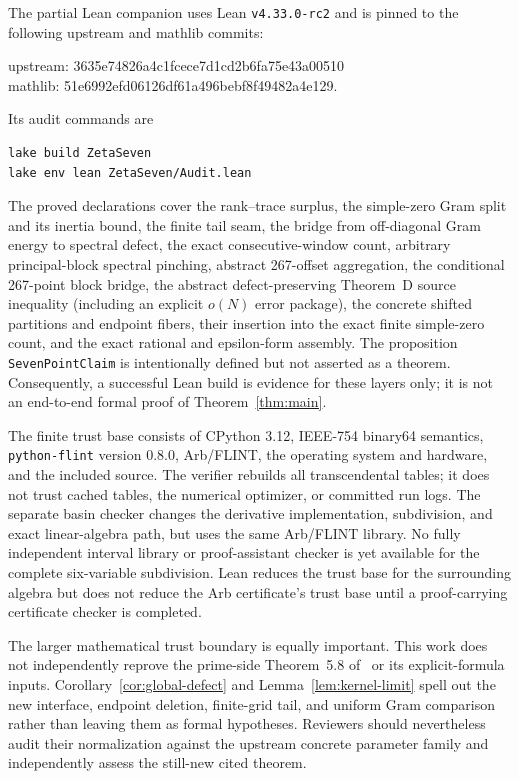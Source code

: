 \documentclass[11pt]{article}
\begin{document}
The partial Lean companion uses Lean \texttt{v4.33.0-rc2} and is pinned to
the following upstream and mathlib commits:
\begin{center}
\small\ttfamily
upstream: 3635e74826a4c1fcece7d1cd2b6fa75e43a00510\\[2pt]
mathlib: 51e6992efd06126df61a496bebf8f49482a4e129.
\end{center}
Its audit commands are
\begin{verbatim}
lake build ZetaSeven
lake env lean ZetaSeven/Audit.lean
\end{verbatim}
The proved declarations cover the rank--trace surplus, the simple-zero Gram
split and its inertia bound, the finite tail seam, the bridge from
off-diagonal Gram energy to spectral defect, the exact consecutive-window
count, arbitrary principal-block spectral pinching, abstract 267-offset
aggregation, the conditional 267-point block bridge, the abstract
defect-preserving Theorem~D source inequality (including an explicit
$o(N)$ error package), the concrete shifted partitions and endpoint fibers,
their insertion into the exact finite simple-zero count, and the exact
rational and epsilon-form assembly.
The proposition \texttt{SevenPointClaim} is intentionally defined but not
asserted as a theorem.  Consequently, a successful Lean build is evidence
for these layers only; it is not an end-to-end formal proof of
Theorem~\ref{thm:main}.

The finite trust base consists of CPython 3.12, IEEE-754 binary64 semantics,
\texttt{python-flint} version 0.8.0, Arb/FLINT, the operating system and hardware,
and the included source.  The verifier rebuilds all transcendental tables; it
does not trust cached tables, the numerical optimizer, or committed run logs.
The separate basin checker changes the derivative implementation,
subdivision, and exact linear-algebra path, but uses the same Arb/FLINT
library.  No fully independent interval library or proof-assistant checker is
yet available for the complete six-variable subdivision.  Lean reduces the
trust base for the surrounding algebra but does not reduce the Arb
certificate's trust base until a proof-carrying certificate checker is
completed.

The larger mathematical trust boundary is equally important.  This work
does not independently reprove the prime-side Theorem~5.8 of~\cite{Claude26}
or its explicit-formula inputs.  Corollary~\ref{cor:global-defect} and
Lemma~\ref{lem:kernel-limit} spell out the new interface, endpoint deletion,
finite-grid tail, and uniform Gram comparison rather than leaving them as
formal hypotheses.  Reviewers should nevertheless audit their normalization
against the upstream concrete parameter family and independently assess the
still-new cited theorem.
\end{document}
